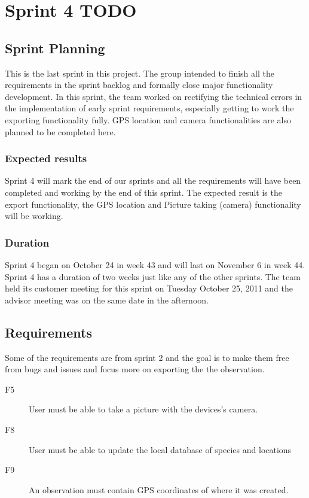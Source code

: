 \section{Sprint 4 TODO}

	\subsection{Sprint Planning}
This is the last sprint in this project. The group intended to finish all the requirements in the sprint backlog and formally close major functionality development. In this sprint, the team worked on rectifying the technical errors in the implementation of early sprint requirements, especially getting to work the exporting functionality fully. GPS location and camera functionalities are also planned to be completed here.
	\subsubsection{Expected results}
Sprint 4 will mark the end of our sprints and all the requirements will have been completed and working by the end of this sprint. The expected result is the export functionality, the GPS location and Picture taking (camera) functionality will be working.	
	\subsubsection{Duration}
Sprint 4 began on October 24 in week 43 and will last on November 6 in week 44. Sprint 4 has a duration of two weeks just like any of the other sprints. The team held its customer meeting for this sprint on Tuesday October 25, 2011 and the advisor meeting was on the same date in the afternoon.
	\subsection{Requirements}
Some of the requirements are from sprint 2 and the goal is to make them free from bugs and issues and focus more on exporting the the observation.
\begin{description}

\item[F5] User must be able to take a picture with the devices's camera.

\item[F8] User must be able to update the local database of species and locations

\item[F9] An observation must contain GPS coordinates of where it was created.

\end{description}
